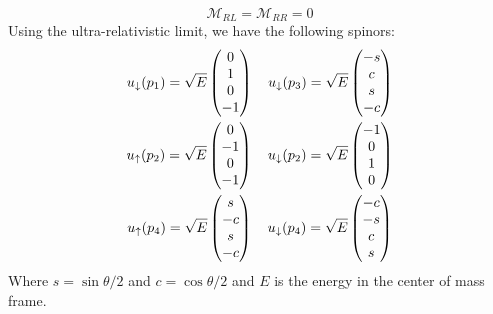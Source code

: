 \documentclass[12pt]{article}
\newcommand{\M}{\mathcal{M}}
\numberwithin{equation}{section}
\begin{document}
\begin{equation}
  \label{eq:t52}
  \boxed{
    \M_{RL}=\M_{RR}=0
  }
\end{equation}
Using the ultra-relativistic limit, we have the following spinors:
\begin{gather*}
  u_\downarrow(p_1)=\sqrt{E}\pmqty{0\\1\\0\\-1}\quad
  u_\downarrow(p_3)=\sqrt{E}\pmqty{-s\\c\\s\\-c}\\
  u_\uparrow(p_2)=\sqrt{E}\pmqty{0\\-1\\0\\-1}\quad
  u_\downarrow(p_2)=\sqrt{E}\pmqty{-1\\0\\1\\0}\\
  u_\uparrow(p_4)=\sqrt{E}\pmqty{s\\-c\\s\\-c}\quad
  u_\downarrow(p_4)=\sqrt{E}\pmqty{-c\\-s\\c\\s}
\end{gather*}
Where $s=\sin\theta/2$ and $c=\cos\theta/2$ and $E$ is the energy in the center of mass frame.
\end{document}
